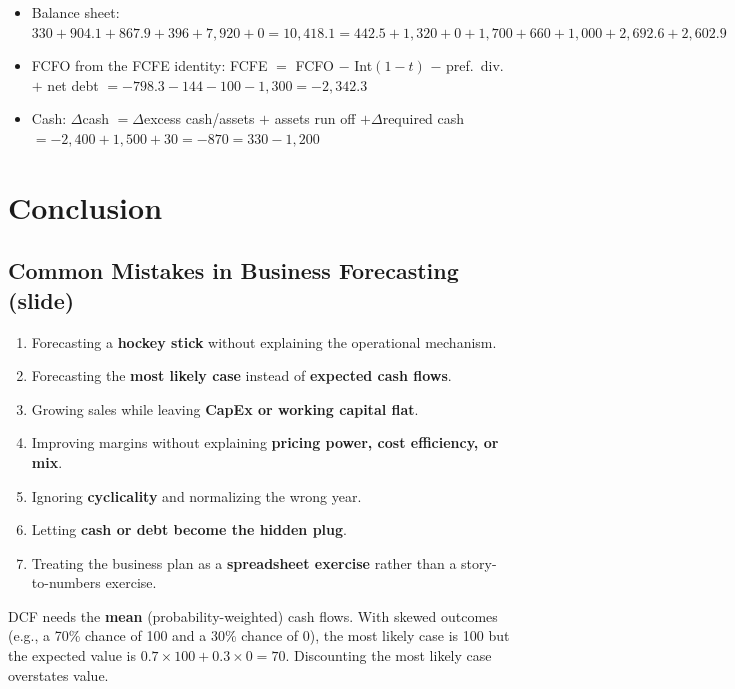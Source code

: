 \begin{exbox}
\begin{itemize}[leftmargin=*]
  \item Balance sheet: $330+904.1+867.9+396+7{,}920+0=10{,}418.1=442.5+1{,}320+0+1{,}700+660+1{,}000+2{,}692.6+2{,}602.9$ \checkmark
  \item FCFO from the FCFE identity: FCFE $=$ FCFO $-$ Int$(1-t)$ $-$ pref.\ div.\ $+$ net debt $=-798.3-144-100-1{,}300=-2{,}342.3$ \checkmark
  \item Cash: $\Delta$cash $=\Delta$excess cash/assets $+$ assets run off $+\Delta$required cash $=-2{,}400+1{,}500+30=-870=330-1{,}200$ \checkmark
\end{itemize}
\end{exbox}



\section{Conclusion}

\subsection{Common Mistakes in Business Forecasting (slide)}
\begin{enumerate}
  \item Forecasting a \textbf{hockey stick} without explaining the operational mechanism.
  \item Forecasting the \textbf{most likely case} instead of \textbf{expected cash flows}.
  \item Growing sales while leaving \textbf{CapEx or working capital flat}.
  \item Improving margins without explaining \textbf{pricing power, cost efficiency, or mix}.
  \item Ignoring \textbf{cyclicality} and normalizing the wrong year.
  \item Letting \textbf{cash or debt become the hidden plug}.
  \item Treating the business plan as a \textbf{spreadsheet exercise} rather than a story-to-numbers exercise.
\end{enumerate}

\begin{addbox}
DCF needs the \textbf{mean} (probability-weighted) cash flows. With skewed outcomes (e.g., a 70\% chance of 100 and a 30\% chance of 0), the most likely case is 100 but the expected value is $0.7\times100+0.3\times0=70$. Discounting the most likely case overstates value.
\end{addbox}

